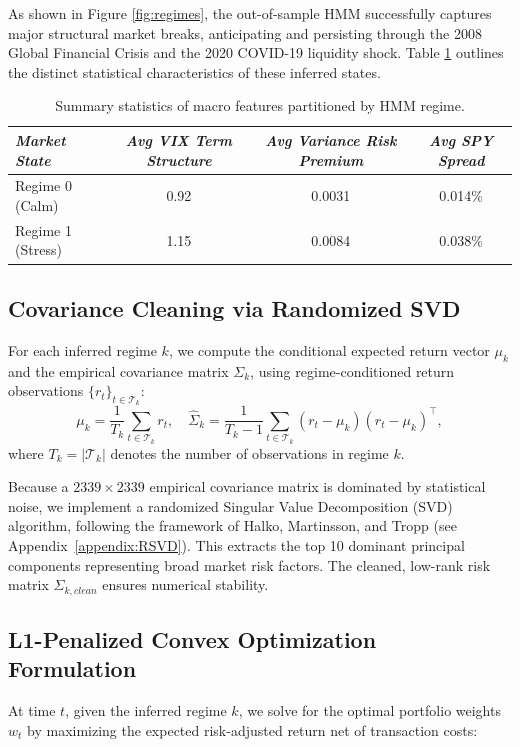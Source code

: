 \documentclass[12pt]{article}
\begin{document}
As shown in Figure \ref{fig:regimes}, the out-of-sample HMM successfully captures major structural market breaks, anticipating and persisting through the 2008 Global Financial Crisis and the 2020 COVID-19 liquidity shock. Table \ref{tab:regime_stats} outlines the distinct statistical characteristics of these inferred states.

\begin{table}[H]
    \centering
    \begin{tabular}{lccc}
        \toprule
        \textit{Market State} & \textit{Avg VIX Term Structure} & \textit{Avg Variance Risk Premium} & \textit{Avg SPY Spread} \\
        \midrule
        Regime 0 (Calm) & 0.92 & 0.0031 & 0.014\% \\
        Regime 1 (Stress) & 1.15 & 0.0084 & 0.038\% \\
        \bottomrule
    \end{tabular}
    \caption{Summary statistics of macro features partitioned by HMM regime.}
    \label{tab:regime_stats}
\end{table}

\subsection{Covariance Cleaning via Randomized SVD}
For each inferred regime $k$, we compute the conditional expected return vector $\mu_k$ and the empirical covariance matrix $\Sigma_k$, using regime-conditioned return observations $\{r_t\}_{t \in \mathcal{T}_k}$:
\begin{equation}
\mu_k = \frac{1}{T_k} \sum_{t \in \mathcal{T}_k} r_t, \quad
\hat{\Sigma}_k = \frac{1}{T_k - 1} \sum_{t \in \mathcal{T}_k} (r_t - \mu_k)(r_t - \mu_k)^\top,
\end{equation}
where $T_k = |\mathcal{T}_k|$ denotes the number of observations in regime $k$.

Because a $2339 \times 2339$ empirical covariance matrix is dominated by statistical noise, we implement a randomized Singular Value Decomposition (SVD) algorithm, following the framework of Halko, Martinsson, and Tropp (see Appendix~\ref{appendix:RSVD}). This extracts the top 10 dominant principal components representing broad market risk factors. The cleaned, low-rank risk matrix $\Sigma_{k,clean}$ ensures numerical stability.



\subsection{L1-Penalized Convex Optimization Formulation}
At time $t$, given the inferred regime $k$, we solve for the optimal portfolio weights $w_t$ by maximizing the expected risk-adjusted return net of transaction costs:
\end{document}
